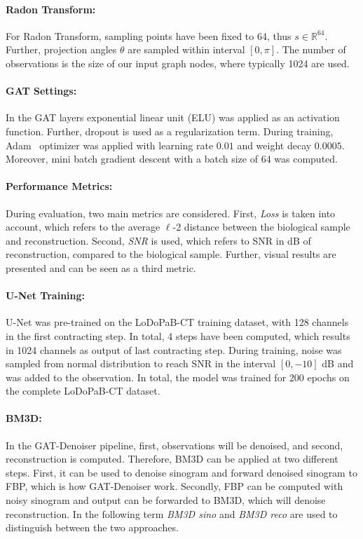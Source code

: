 \paragraph{Radon Transform:}
For Radon Transform, sampling points have been fixed to 64, thus $s \in \mathbb{R}^{64}$.
Further, projection angles $\theta$ are sampled within interval $[0, \pi]$.
The number of observations is the size of our input graph nodes, where typically 1024 are used.

\paragraph{GAT Settings:}
In the GAT layers exponential linear unit (ELU) was applied as an activation function.
Further, dropout is used as a regularization term.
During training, Adam~\cite{adam} optimizer was applied with learning rate $0.01$ and weight decay $0.0005$.
Moreover, mini batch gradient descent with a batch size of 64 was computed.

\paragraph{Performance Metrics:}
During evaluation, two main metrics are considered.
First, \textit{Loss} is taken into account, which refers to the average $\ell$-2 distance between the biological sample and reconstruction.
Second, \textit{SNR} is used, which refers to SNR in dB of reconstruction, compared to the biological sample.
Further, visual results are presented and can be seen as a third metric.


\paragraph{U-Net Training:}
U-Net was pre-trained on the LoDoPaB-CT training dataset, with 128 channels in the first contracting step. 
In total, 4 steps have been computed, which results in 1024 channels as output of last contracting step.
During training, noise was sampled from normal distribution to reach SNR in the interval $[0, -10]$ dB 
and was added to the observation. In total, the model was trained for 200 epochs on the complete LoDoPaB-CT dataset.

\paragraph{BM3D:}
In the GAT-Denoiser pipeline, first, observations will be denoised, and second, reconstruction is computed.
Therefore, BM3D can be applied at two different steps. First, it can be used to denoise sinogram
and forward denoised sinogram to FBP, which is how GAT-Denoiser work. Secondly, FBP can be
computed with noisy sinogram and output can be forwarded to BM3D, which will denoise reconstruction.
In the following term \textit{BM3D sino} and \textit{BM3D reco} are used to distinguish between the two approaches.

